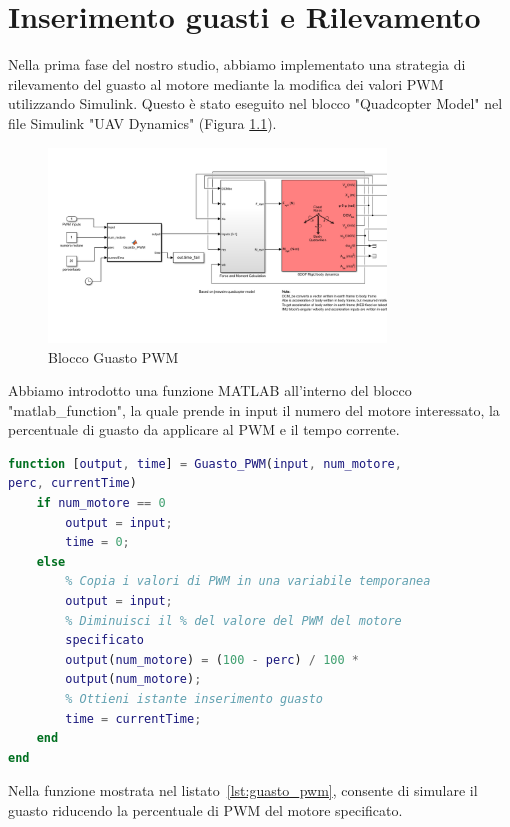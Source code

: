 \chapter{Inserimento guasti e Rilevamento}

Nella prima fase del nostro studio, abbiamo implementato una strategia di rilevamento del guasto al motore mediante la modifica dei valori PWM utilizzando Simulink. Questo è stato eseguito nel blocco "Quadcopter Model" nel file Simulink "UAV Dynamics" (Figura \ref{fig:guasto PWM}).
\begin{figure}[H]  %
    \centering
    \includegraphics[width=0.8\textwidth]{guasto_pwm.png}
    \caption{Blocco Guasto PWM}
    \label{fig:guasto PWM}
\end{figure}
\noindent
Abbiamo introdotto una funzione MATLAB all'interno del blocco "matlab\_function", la quale prende in input il numero del motore interessato, la percentuale di guasto da applicare al PWM e il tempo corrente.

\begin{lstlisting}[language=Matlab, caption={Funzione MATLAB per il rilevamento del guasto PWM}, label=lst:guasto_pwm]
function [output, time] = Guasto_PWM(input, num_motore, 
perc, currentTime)   
    if num_motore == 0
        output = input;
        time = 0;
    else
        % Copia i valori di PWM in una variabile temporanea
        output = input;
        % Diminuisci il % del valore del PWM del motore 
        specificato
        output(num_motore) = (100 - perc) / 100 * 
        output(num_motore);
        % Ottieni istante inserimento guasto
        time = currentTime;
    end
end
\end{lstlisting}
\noindent

Nella funzione mostrata nel listato~\ref{lst:guasto_pwm}, consente di simulare il guasto riducendo la percentuale di PWM del motore specificato. 


